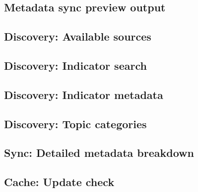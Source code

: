 \documentclass[bib]{statapress}
\begin{document}
\subsection{Metadata sync preview output}
\begin{stlog}
\nullskip
\end{stlog}

\subsection{Discovery: Available sources}\label{app:diagnostics:sources}
\begin{stlog}
\nullskip
\end{stlog}

\subsection{Discovery: Indicator search}\label{app:diagnostics:search}
\begin{stlog}
\nullskip
\end{stlog}

\subsection{Discovery: Indicator metadata}\label{app:diagnostics:info}
\begin{stlog}
\nullskip
\end{stlog}

\subsection{Discovery: Topic categories}\label{app:diagnostics:alltopics}
\begin{stlog}
\nullskip
\end{stlog}

\subsection{Sync: Detailed metadata breakdown}\label{app:diagnostics:sync}
\begin{stlog}
\nullskip
\end{stlog}

\subsection{Cache: Update check}\label{app:diagnostics:checkupdate}
\begin{stlog}
\nullskip
\end{stlog}
\end{document}
